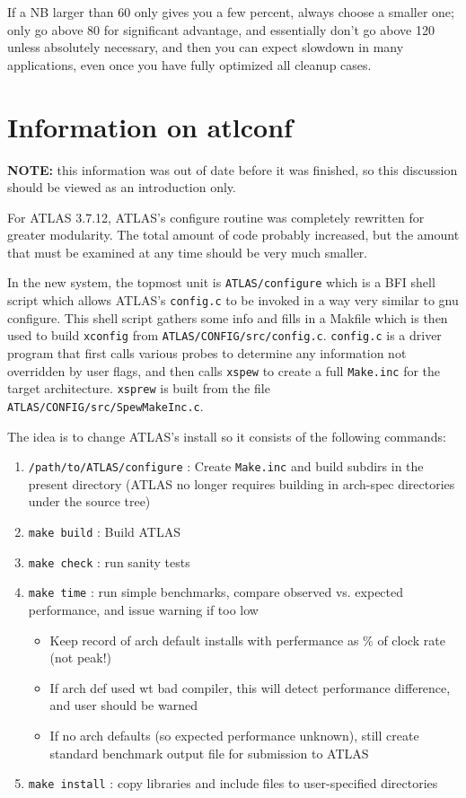 \documentclass[11pt]{article}
\begin{document}
If a NB larger than 60 only gives you a few percent, always choose a 
smaller one; only go above 80 for significant advantage, and essentially
don't go above 120 unless absolutely necessary, and then you can expect
slowdown in many applications, even once you have fully optimized all
cleanup cases.

\newpage
\section{Information on atlconf}
{\bf NOTE:} this information was out of date before it was finished, so
this discussion should be viewed as an introduction only.

For ATLAS 3.7.12, ATLAS's configure routine was completely rewritten for
greater modularity.  The total amount of code probably increased, but the
amount that must be examined at any time should be very much smaller. 

In the new system, the topmost unit is {\tt ATLAS/configure} which is a 
BFI shell script which allows ATLAS's {\tt config.c} to be invoked in a
way very similar to gnu configure.  This shell script gathers some info
and fills in a Makfile which is then used to build {\tt xconfig} from
{\tt ATLAS/CONFIG/src/config.c}.  {\tt config.c} is a driver program
that first calls various probes to determine any information not overridden by
user flags, and then calls {\tt xspew} to create a full {\tt Make.inc} for
the target architecture.  {\tt xsprew} is built from the file 
{\tt ATLAS/CONFIG/src/SpewMakeInc.c}.  

The idea is to change ATLAS's install so it consists of the following
commands:
\begin{enumerate}
\item {\tt /path/to/ATLAS/configure} : Create {\tt Make.inc} and build subdirs
      in the present directory (ATLAS no longer requires building in arch-spec
      directories under the source tree)
\item {\tt make build} : Build ATLAS
\item {\tt make check} : run sanity tests
\item {\tt make time} : run simple benchmarks, compare observed vs. expected
      performance, and issue warning if too low
   \begin{itemize}
   \item Keep record of arch default installs with perfermance as \% of
         clock rate (not peak!)
   \item If arch def used wt bad compiler, this will detect performance
         difference, and user should be warned
   \item If no arch defaults (so expected performance unknown), still create
         standard benchmark output file for submission to ATLAS
   \end{itemize}
\item {\tt make install} : copy libraries and include files to user-specified
      directories
\end{enumerate}
\end{document}
